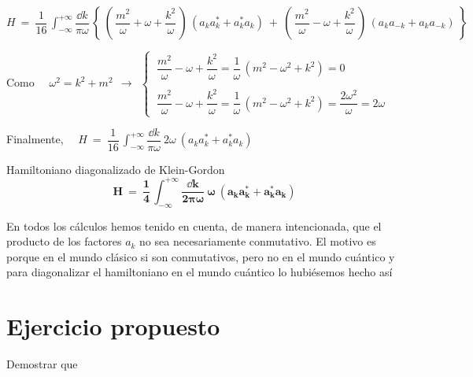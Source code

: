 {\vspace{5mm}

$\displaystyle H \ = \  
\dfrac 1{16}\, \int_{-\infty}^{+\infty} \dfrac{\dd k}{\pi \omega} \, 
\left\{ \
\left( \, \dfrac {m^2}{\omega} + \omega + \dfrac{k^2}{\omega} \, \right) \, (a_ka^*_k+a^*_ka_k) \ + \ 
\left( \, \dfrac {m^2}{\omega} - \omega + \dfrac{k^2}{\omega} \, \right) \, (a_ka_{-k}+a_ka_{-k})
\ \right\} $

Como $\quad \omega^2=k^2+m^2 \ \ \to \ \ 
\begin{cases}
\ \dfrac{m^2}{\omega} - \omega + \dfrac{k^2}{\omega} = \dfrac 1 \omega\, (m^2-\omega^2+k^2)=0 \\ \\
\ \dfrac{m^2}{\omega} - \omega + \dfrac{k^2}{\omega} = \dfrac 1 \omega\, (m^2-\omega^2+k^2)=\dfrac{2\omega^2}{\omega}=2\omega \end{cases}$

Finalmente, $\quad \displaystyle H \ = \ 
\dfrac 1{16}\, \int_{-\infty}^{+\infty} \dfrac{\dd k}{\pi \omega} \ 2\omega \ 
(a_ka^*_{k}+a^*_ka_{k}) $

\vspace{5mm}
\begin{large}
\begin{myblock}{Hamiltoniano diagonalizado de Klein-Gordon}
\vspace{2mm}
\begin{equation}
	\label{T40Hdiag}
	\boldsymbol{ \boxed{ \ 
	H \ = \ \dfrac 1{4}\, \int_{-\infty}^{+\infty} \dfrac{\dd k}{2 \pi \omega} \ \omega \ 
(a_ka^*_{k}+a^*_ka_{k}) 
	\ } }
\end{equation}
\vspace{2mm}
\end{myblock}
\end{large}

\vspace{5mm}\textcolor{gris}{En todos los cálculos hemos tenido en cuenta, de manera intencionada, que el producto de los factores $a_k$ no sea necesariamente conmutativo. El motivo es porque en el mundo clásico si son conmutativos, pero no en el mundo cuántico y para diagonalizar el hamiltoniano en el mundo cuántico lo hubiésemos hecho así}


\vspace{10mm}

\section{Ejercicio propuesto}
\vspace{5mm}
\begin{ejercicio}
\begin{adjustwidth}{30pt}{20pt}
\vspace{2mm}
Demostrar que 


\end{adjustwidth}
\end{ejercicio}}
